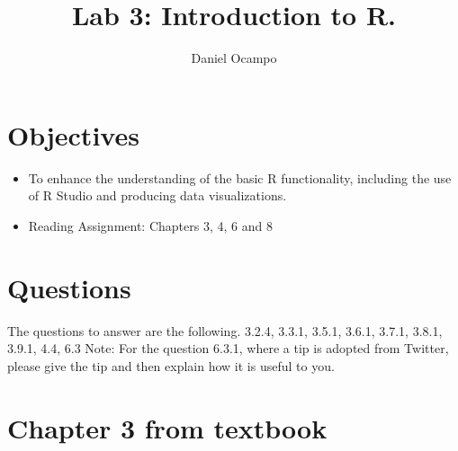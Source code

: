 \documentclass[11pt]{article}
\begin{document}
%
\author{Daniel Ocampo}
\title{Lab 3: Introduction to R.}
\maketitle

\section{Objectives}
\begin{itemize}

\item To enhance the understanding of the basic R functionality, including the use of R Studio and producing data visualizations. 
\item Reading Assignment: Chapters 3, 4, 6 and 8 

\end{itemize}

\section{Questions}
The questions to answer are the following.
{3.2.4, 3.3.1, 3.5.1, 3.6.1, 3.7.1, 3.8.1, 3.9.1, 4.4, 6.3}
Note: For the question 6.3.1, where a tip is adopted from Twitter, please give the tip and then explain how it is useful to you.


\section{ Chapter 3 from textbook}
\end{document}
